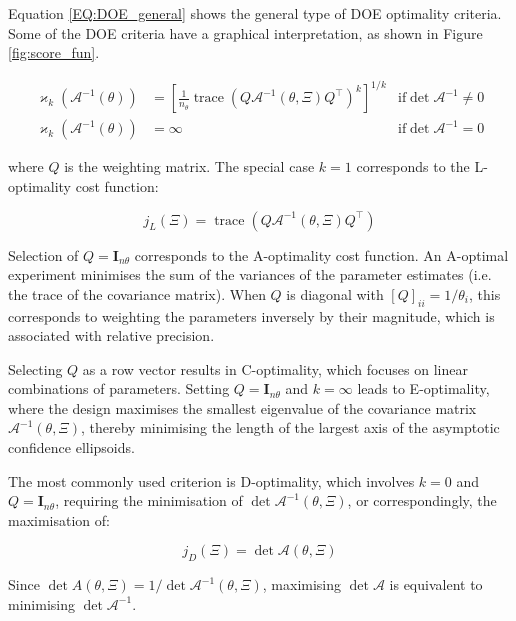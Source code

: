 \documentclass[a4paper,fleqn]{cas-dc}
\begin{document}
		Equation \ref{EQ:DOE_general} shows the general type of DOE optimality criteria. Some of the DOE criteria have a graphical interpretation, as shown in Figure \ref{fig:score_fun}.
		
		{\footnotesize 
			\begin{align} \label{EQ:DOE_general}
				\varkappa_k\left( \mathcal{A}^{-1}(\theta) \right) &= \left[ \frac{1}{n_\theta} \operatorname{trace}\left( Q \mathcal{A}^{-1}(\theta, \Xi) Q^\top \right)^k \right]^{1/k} & \text{if} \det \mathcal{A}^{-1} \neq 0 \nonumber \\ 
				\varkappa_k\left( \mathcal{A}^{-1}(\theta) \right) &= \infty & \text{if} \det \mathcal{A}^{-1} = 0
		\end{align} }
		
		where $Q$ is the weighting matrix. The special case $k=1$ corresponds to the L-optimality cost function:
		
		{\footnotesize 
			\begin{equation} 
				j_L(\Xi) = \operatorname{trace} \left( Q \mathcal{A}^{-1}(\theta, \Xi) Q^\top \right) 
			\end{equation} }
		
		Selection of $Q = \mathbf{I}_{n\theta}$ corresponds to the A-optimality cost function. An A-optimal experiment minimises the sum of the variances of the parameter estimates (i.e. the trace of the covariance matrix). When $Q$ is diagonal with $[Q]_{ii} = 1/\theta_i$, this corresponds to weighting the parameters inversely by their magnitude, which is associated with relative precision.
		
		Selecting $Q$ as a row vector results in C-optimality, which focuses on linear combinations of parameters. Setting $Q = \mathbf{I}_{n\theta}$ and $k = \infty$ leads to E-optimality, where the design maximises the smallest eigenvalue of the covariance matrix $\mathcal{A}^{-1}(\theta, \Xi)$, thereby minimising the length of the largest axis of the asymptotic confidence ellipsoids.
		
		The most commonly used criterion is D-optimality, which involves $k = 0$ and $Q = \mathbf{I}_{n\theta}$, requiring the minimisation of $\det \mathcal{A}^{-1}(\theta, \Xi)$, or correspondingly, the maximisation of:
		
		{\footnotesize 
			\begin{equation} \label{EQ:D-optimality}
				j_D(\Xi) = \det \mathcal{A}(\theta, \Xi) 
			\end{equation} }
		
		Since $\det A(\theta, \Xi) = 1 / \det \mathcal{A}^{-1}(\theta, \Xi)$, maximising $\det \mathcal{A}$ is equivalent to minimising $\det \mathcal{A}^{-1}$.
		
\end{document}
